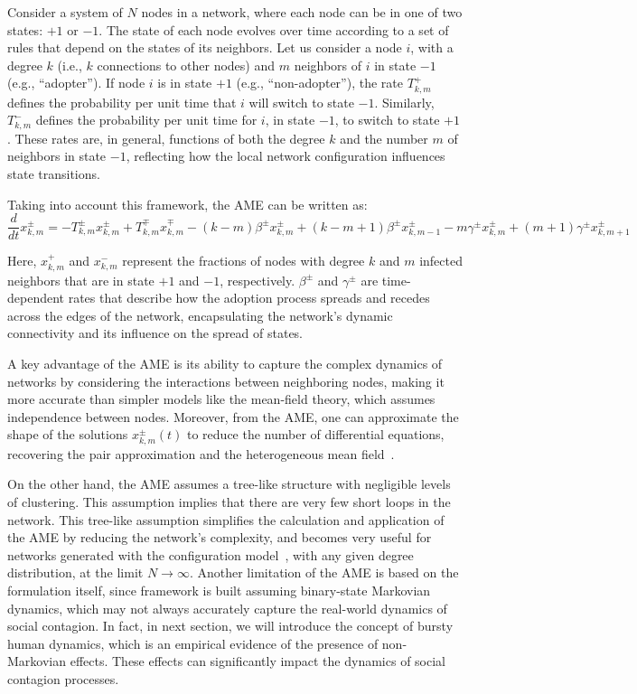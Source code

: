 Consider a system of $N$ nodes in a network, where each node can be in one of two states: $+1$ or $-1$. The state of each node evolves over time according to a set of rules that depend on the states of its neighbors. Let us consider a node $i$, with a degree $k$ (i.e., $k$ connections to other nodes) and $m$ neighbors of $i$ in state $-1$ (e.g., ``adopter''). If node $i$ is in state $+1$ (e.g., ``non-adopter''), the rate \( T^{+}_{k,m} \) defines the probability per unit time that $i$ will switch to state $-1$. Similarly, \( T^{-}_{k,m} \) defines the probability per unit time for $i$, in state $-1$, to switch to state $+1$. These rates are, in general, functions of both the degree $k$ and the number $m$ of neighbors in state $-1$, reflecting how the local network configuration influences state transitions.

Taking into account this framework, the AME can be written as:
\begin{equation}
    \frac{d}{dt} x^{\pm}_{k,m} = -T^{\pm}_{k,m} x^{\pm}_{k,m} + T^{\mp}_{k,m} x^{\mp}_{k,m} - (k-m) \beta^{\pm} x^{\pm}_{k,m} + (k-m+1) \beta^{\pm} x^{\pm}_{k,m-1} - m \gamma^{\pm} x^{\pm}_{k,m} + (m+1) \gamma^{\pm} x^{\pm}_{k,m+1}
\end{equation}

Here, $x^{+}_{k,m}$ and $x^{-}_{k,m}$ represent the fractions of nodes with degree $k$ and $m$ infected neighbors that are in state $+1$ and $-1$, respectively. $\beta^{\pm}$ and $\gamma^{\pm}$ are time-dependent rates that describe how the adoption process spreads and recedes across the edges of the network, encapsulating the network's dynamic connectivity and its influence on the spread of states.

A key advantage of the AME is its ability to capture the complex dynamics of networks by considering the interactions between neighboring nodes, making it more accurate than simpler models like the mean-field theory, which assumes independence between nodes. Moreover, from the AME, one can approximate the shape of the solutions $x^{\pm}_{k,m} (t)$ to reduce the number of differential equations, recovering the pair approximation and the heterogeneous mean field~\cite{gleeson-2011,gleeson-2013}.

On the other hand, the AME assumes a tree-like structure with negligible levels of clustering. This assumption implies that there are very few short loops in the network. This tree-like assumption simplifies the calculation and application of the AME by reducing the network's complexity, and becomes very useful for networks generated with the configuration model~\cite{newman-book}, with any given degree distribution, at the limit $N \to \infty$. Another limitation of the AME is based on the formulation itself, since framework is built assuming binary-state Markovian dynamics, which may not always accurately capture the real-world dynamics of social contagion. In fact, in next section, we will introduce the concept of bursty human dynamics, which is an empirical evidence of the presence of non-Markovian effects. These effects can significantly impact the dynamics of social contagion processes.

